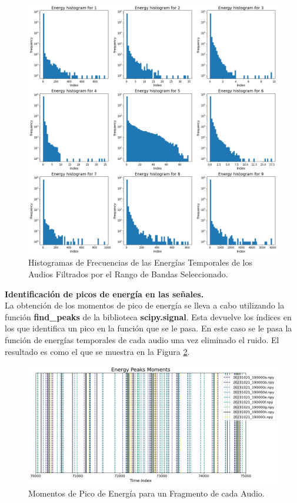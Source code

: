 \documentclass[a4paper,10pt,twocolumn]{article}
\begin{document}
\begin{figure}[h!]
    \centering
    \includegraphics[width=\columnwidth]{assets/energy_hist.png}
    \caption{Histogramas de Frecuencias de las Energías Temporales de los Audios Filtrados por el Rango de Bandas Seleccionado.}
    \label{fig:hist}
\end{figure}


\textbf{Identificación de picos de energía en las señales.}\\

La obtención de los momentos de pico de energía se lleva a cabo utilizando
la función \textbf{find\_peaks} de la biblioteca \textbf{scipy.signal}.
Esta devuelve los índices en los que identifica un pico en la función que se le pasa.
En este caso se le pasa la función de energías temporales de cada audio una vez eliminado el ruido.
El resultado es como el que se muestra en la Figura \ref{fig:peaks}.\\

\begin{figure}[h!]
    \centering
    \includegraphics[width=\columnwidth]{assets/peaks_before.png}
    \caption{Momentos de Pico de Energía para un Fragmento de cada Audio.}
    \label{fig:peaks}
\end{figure}
\end{document}
